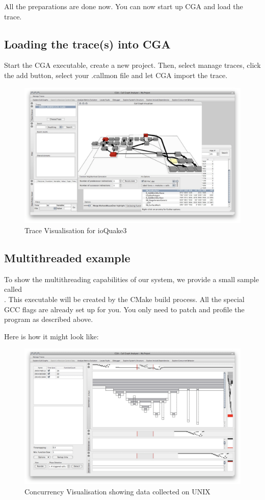 All the preparations are done now. You can now start up CGA and load the trace.

\subsection{Loading the trace(s) into CGA} Start the CGA executable, create a new project. Then, select manage traces, click the add button, select your .callmon file and let CGA import the trace.

\begin{figure}[ht]
\centering
\includegraphics[width=16cm]{images/ioquake3_trace}
\caption{Trace Visualisation for ioQuake3}\label{fig:ioquake3_trace}
\end{figure}

\subsection{Multithreaded example} To show the multithreading capabilities of our system, we provide a small sample called\\. This executable will be created by the CMake build process. All the special GCC flags are already set up for you. You only need to patch and profile the program as described above.

Here is how it might look like:

\begin{figure}[ht]
\centering
\includegraphics[width=16cm]{images/cga_threads}
\caption{Concurrency Visualisation showing data collected on UNIX}\label{fig:cga_threads}
\end{figure}
